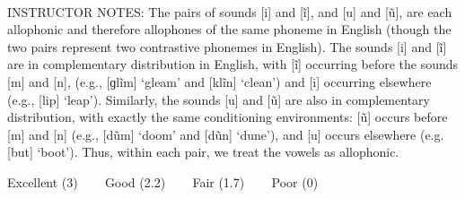 \documentclass[12pt]{article}
\begin{document}
~\\
INSTRUCTOR NOTES: The pairs of sounds [i] and [ĩ], and [u] and [ũ], are each allophonic and therefore allophones of the same phoneme in English (though the two pairs represent two contrastive phonemes in English). The sounds [i] and [ĩ] are in complementary distribution in English, with [ĩ] occurring before the sounds [m] and [n], (e.g., [ɡlĩm] ‘gleam’ and [klĩn] ‘clean’) and [i] occurring elsewhere (e.g., [lip] ‘leap’). Similarly, the sounds [u] and [ũ] are also in complementary distribution, with exactly the same conditioning environments: [ũ] occurs before [m] and [n] (e.g., [dũm] ‘doom’ and [dũn] ‘dune’), and [u] occurs elsewhere (e.g. [but] ‘boot’). Thus, within each pair, we treat the vowels as allophonic. 


\vfill
Excellent (3) ~~~ Good (2.2) ~~~ Fair (1.7) ~~~ Poor (0)
\newpage

\begin{center}
\textbf{{\color{red}{\HUGE END OF EXAM}}}\\

\end{center}
\newpage
\end{document}
